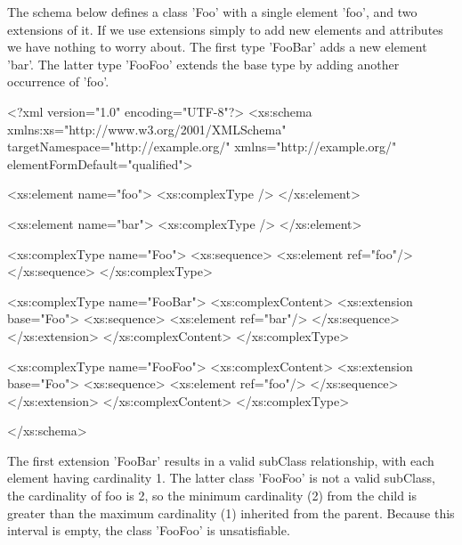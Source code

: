 The schema below defines a class 'Foo' with a single element 'foo', and two extensions of it. If we use extensions simply to add new elements and attributes we have nothing to worry about. The first type 'FooBar' adds a new element 'bar'. The latter type 'FooFoo' extends the base type by adding another occurrence of 'foo'.


\begin{DoxyCodeInclude}
<?xml version="1.0" encoding="UTF-8"?>
<xs:schema xmlns:xs="http://www.w3.org/2001/XMLSchema" 
        targetNamespace="http://example.org/" xmlns="http://example.org/"
        elementFormDefault="qualified">
        
        <xs:element name="foo">
                <xs:complexType />
        </xs:element>

        <xs:element name="bar">
                <xs:complexType />
        </xs:element>
        
        <xs:complexType name="Foo">
                <xs:sequence>
                        <xs:element ref="foo"/>
                </xs:sequence>
        </xs:complexType>
        
        <xs:complexType name="FooBar">
                <xs:complexContent>
                        <xs:extension base="Foo">
                                <xs:sequence>
                                        <xs:element ref="bar"/>
                                </xs:sequence>
                        </xs:extension>
                </xs:complexContent>
        </xs:complexType>
        
        <xs:complexType name="FooFoo">
                <xs:complexContent>
                        <xs:extension base="Foo">
                                <xs:sequence>
                                        <xs:element ref="foo"/>
                                </xs:sequence>
                        </xs:extension>
                </xs:complexContent>
        </xs:complexType>       
        
</xs:schema>
\end{DoxyCodeInclude}


The first extension 'FooBar' results in a valid subClass relationship, with each element having cardinality 1. The latter class 'FooFoo' is not a valid subClass, the cardinality of foo is 2, so the minimum cardinality (2) from the child is greater than the maximum cardinality (1) inherited from the parent. Because this interval is empty, the class 'FooFoo' is unsatisfiable.


